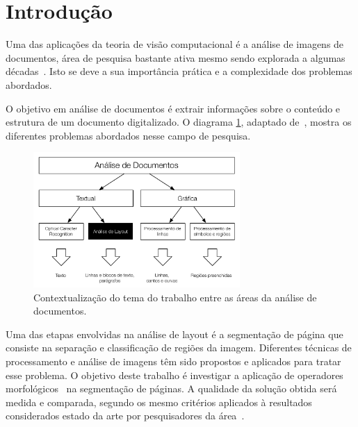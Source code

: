 \documentclass[10pt,a4paper,conference]{IEEEtran}
\begin{document}



\section{Introdução}

Uma das aplicações da teoria de visão computacional é a análise de
imagens de documentos, área de pesquisa bastante ativa mesmo sendo
explorada a algumas décadas~\cite{10.1109/ICDAR.2007.207}. Isto se deve a sua importância
prática e a complexidade dos problemas abordados.

O objetivo em análise de documentos é extrair informações sobre o
conteúdo e estrutura de um documento digitalizado. O diagrama
\ref{fig:context1}, adaptado de~\cite{Kasturi_OGorman_Govindaraju_2002},
 mostra os diferentes problemas abordados nesse campo de pesquisa.
\begin{figure}[htb]
\begin{center}
\includegraphics[width=0.7\textwidth]{assets/document_processing_areas_hierarquies.pdf}
\end{center}
\caption{Contextualização do tema do trabalho entre as áreas da
  análise de documentos.}
\label{fig:context1}
\end{figure}

Uma das etapas envolvidas na análise de layout é a segmentação de
página que consiste na separação e classificação de regiões da
imagem. Diferentes técnicas de processamento e análise de imagens têm
sido propostos e aplicados para tratar esse problema.
O objetivo deste trabalho é investigar a aplicação de operadores
morfológicos~\cite{Serra:1983:IAM:1098652} na segmentação de
páginas. A qualidade da solução obtida será medida e comparada,
segundo os mesmo critérios aplicados à resultados considerados estado
da arte por pesquisadores da área~\cite{10.1109/ICDAR.2007.207}.
\end{document}
